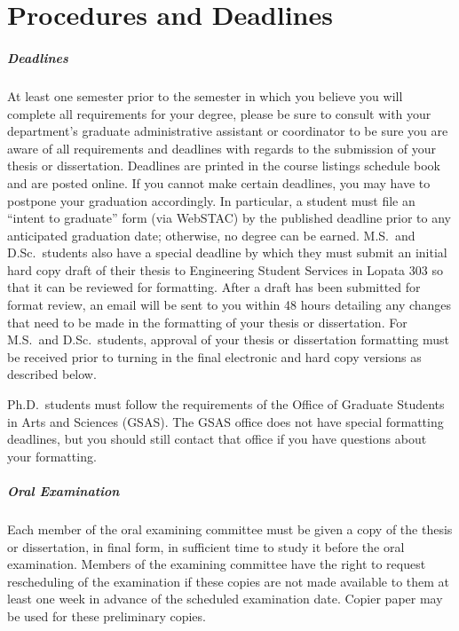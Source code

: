 \chapter{Procedures and Deadlines}
\label{app:procedures}

\paragraph{Deadlines}

At least one semester prior to the semester in which you believe you will
complete all requirements for your degree, please be sure to consult with your
department’s graduate administrative assistant or coordinator to be sure you
are aware of all requirements and deadlines with regards to the submission of
your thesis or dissertation.  Deadlines are printed in the course listings
schedule book and are posted online.  If you cannot make certain deadlines, you
may have to postpone your graduation accordingly.  In particular, a student
must file an ``intent to graduate'' form (via WebSTAC) by the published
deadline prior to any anticipated graduation date; otherwise, no degree can be
earned.  M.S.\ and D.Sc.\ students also have a special deadline by which they
must submit an initial hard copy draft of their thesis to Engineering Student
Services in Lopata 303 so that it can be reviewed for formatting.  After a
draft has been submitted for format review, an email will be sent to you within
48 hours detailing any changes that need to be made in the formatting of your
thesis or dissertation.  For M.S.\ and D.Sc.\ students, approval of your thesis
or dissertation formatting must be received prior to turning in the final
electronic and hard copy versions as described below.  

Ph.D.\ students must follow the requirements of the Office of Graduate Students
in Arts and Sciences (GSAS).  The GSAS office does not have special formatting
deadlines, but you should still contact that office if you have questions about
your formatting.

\paragraph{Oral Examination}

Each member of the oral examining committee must be given a copy of the thesis
or dissertation, in final form, in sufficient time to study it before the oral
examination.  Members of the examining committee have the right to request
rescheduling of the examination if these copies are not made available to them
at least one week in advance of the scheduled examination date.  Copier paper
may be used for these preliminary copies.

